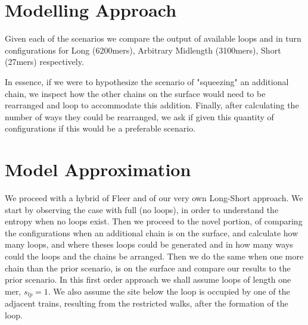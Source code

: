 \documentclass[10pt,letterpaper]{article}
\begin{document}
\section*{Modelling Approach}

\noindent Given each of the scenarios we compare the output of available loops and in turn configurations for Long (6200mers), Arbitrary Midlength (3100mers), Short (27mers) respectively.




\noindent In essence, if we were to hypothesize the scenario of "squeezing" an additional chain, we inspect how the other chains on the surface would need to be rearranged and loop to accommodate this addition. Finally, after calculating the number of ways they could be rearranged, we ask if given this quantity of configurations if this would be a preferable scenario.

\section*{Model Approximation}
We proceed with a hybrid of Fleer \cite{fleer1993polymers} and of our very own Long-Short approach. We start by observing the case with full (no loops), in order to understand the entropy when no loops exist. Then we proceed to the novel portion, of comparing the configurations when an additional chain is on the surface, and calculate how many loops, and where theses loops could be generated and in how many ways could the loops and the chains be arranged. Then we do the same when one more chain than the prior scenario, is on the surface and compare our results to the prior scenario. In this first order approach we shall assume loops of length one mer, $s_{lp}=1$. We also assume the site below the loop is occupied by one of the adjacent trains, resulting from the restricted walks, after the formation of the loop.
\end{document}
